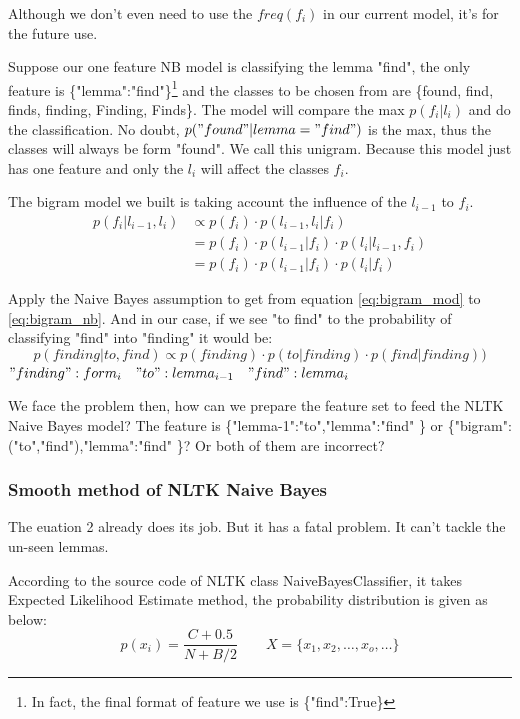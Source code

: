 \documentclass[a4paper]{article}
\begin{document}
Although we don't even need to use the $freq(f_i)$ in our current model, it's for the future use.

Suppose our one feature NB model is classifying the lemma "find", the only feature is \{"lemma":"find"\}\footnote{In fact, the final format of feature we use is \{"find":True\}} and the classes to be chosen from are \{found, find, finds, finding, Finding, Finds\}. The model will compare the max $p(f_i|l_i)$ and do the classification. No doubt, $p("found" | lemma="find")$ is the max, thus the classes will always be form "found". We call this unigram. Because this model just has one feature and only the $l_i$ will affect the classes $f_i$. 

The bigram model we built is taking account the influence of the $l_{i-1}$ to $f_i$.
\begin{align}
p(f_i|l_{i-1},l_i) &\propto p(f_i) \cdot  p(l_{i-1},l_i|f_i)  \\
&= p(f_i) \cdot  p(l_{i-1}|f_i) \cdot p( l_i | l_{i-1},f_i) \label{eq:bigram_mod} \\
&= p(f_i) \cdot  p(l_{i-1}|f_i) \cdot p( l_i | f_i) \label{eq:bigram_nb}
\end{align}

Apply the Naive Bayes assumption to get from equation \ref{eq:bigram_mod} to \ref{eq:bigram_nb}. And in our case, if we see "to find" to the probability of classifying "find" into "finding"   it would be:
\begin{equation}
p(finding | to,find) \propto p(finding)\cdot p(to | finding) \cdot  p(find | finding))
\end{equation}
$"finding":form_i \quad "to":lemma_{i-1} \quad "find":lemma_i$


We face the problem then, how can we prepare the feature set to feed the NLTK Naive Bayes model? The feature is \{"lemma-1":"to","lemma":"find" \} or 
 \{"bigram":("to","find"),"lemma":"find" \}? Or both of them are incorrect? 
\subsubsection{Smooth method of NLTK Naive Bayes}
The euation 2 already does its job. But it has a fatal problem. It can't tackle the un-seen lemmas. 

According to the source code of NLTK class NaiveBayesClassifier, it takes Expected Likelihood Estimate method, the probability distribution is given as below:
\begin{equation}
p(x_i)=\frac{C+0.5}{N+B/2} \qquad X = \{x_1,x_2,\dots,x_o,\dots\}
\end{equation}
\end{document}
